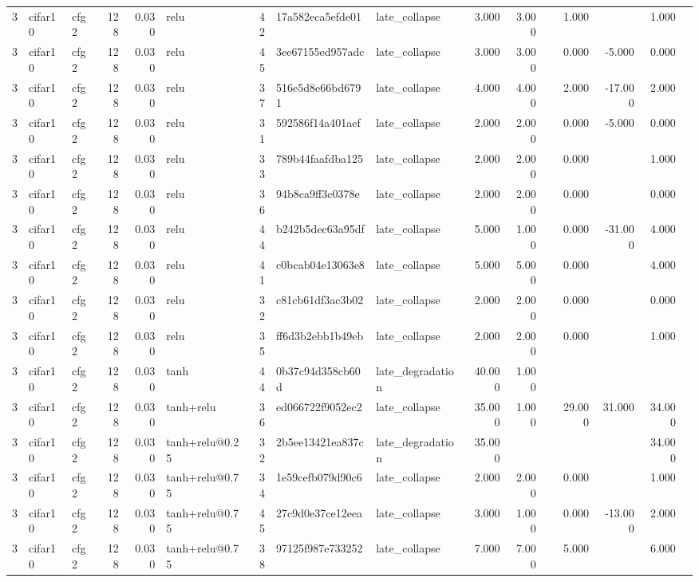 \begin{table}[htbp]
{\begin{tabular}{@{}rllrrlrllrrrrrrr@{}}
3 & cifar10 & cfg2 & 128 & 0.030 & relu & 42 & 17a582eca5efde01 & late\_collapse & 3.000 & 3.000 &  & 1.000 &  & 1.000 &  \\
3 & cifar10 & cfg2 & 128 & 0.030 & relu & 45 & 3ee67155ed957adc & late\_collapse & 3.000 & 3.000 &  & 0.000 & -5.000 & 0.000 &  \\
3 & cifar10 & cfg2 & 128 & 0.030 & relu & 37 & 516e5d8e66bd6791 & late\_collapse & 4.000 & 4.000 &  & 2.000 & -17.000 & 2.000 &  \\
3 & cifar10 & cfg2 & 128 & 0.030 & relu & 31 & 592586f14a401aef & late\_collapse & 2.000 & 2.000 &  & 0.000 & -5.000 & 0.000 &  \\
3 & cifar10 & cfg2 & 128 & 0.030 & relu & 33 & 789b44faafdba125 & late\_collapse & 2.000 & 2.000 &  & 0.000 &  & 1.000 &  \\
3 & cifar10 & cfg2 & 128 & 0.030 & relu & 36 & 94b8ca9ff3c0378e & late\_collapse & 2.000 & 2.000 &  & 0.000 &  & 0.000 &  \\
3 & cifar10 & cfg2 & 128 & 0.030 & relu & 44 & b242b5dec63a95df & late\_collapse & 5.000 & 1.000 &  & 0.000 & -31.000 & 4.000 &  \\
3 & cifar10 & cfg2 & 128 & 0.030 & relu & 41 & c0bcab04e13063e8 & late\_collapse & 5.000 & 5.000 &  & 0.000 &  & 4.000 &  \\
3 & cifar10 & cfg2 & 128 & 0.030 & relu & 32 & c81cb61df3ac3b02 & late\_collapse & 2.000 & 2.000 &  & 0.000 &  & 0.000 &  \\
3 & cifar10 & cfg2 & 128 & 0.030 & relu & 35 & ff6d3b2ebb1b49eb & late\_collapse & 2.000 & 2.000 &  & 0.000 &  & 1.000 &  \\
3 & cifar10 & cfg2 & 128 & 0.030 & tanh & 44 & 0b37c94d358cb60d & late\_degradation & 40.000 & 1.000 &  &  &  &  &  \\
3 & cifar10 & cfg2 & 128 & 0.030 & tanh+relu & 36 & ed066722f9052ec2 & late\_collapse & 35.000 & 1.000 &  & 29.000 & 31.000 & 34.000 &  \\
3 & cifar10 & cfg2 & 128 & 0.030 & tanh+relu@0.25 & 32 & 2b5ee13421ea837c & late\_degradation & 35.000 &  &  &  &  & 34.000 &  \\
3 & cifar10 & cfg2 & 128 & 0.030 & tanh+relu@0.75 & 34 & 1e59cefb079d90c6 & late\_collapse & 2.000 & 2.000 &  & 0.000 &  & 1.000 &  \\
3 & cifar10 & cfg2 & 128 & 0.030 & tanh+relu@0.75 & 45 & 27c9d0e37ce12eea & late\_collapse & 3.000 & 1.000 &  & 0.000 & -13.000 & 2.000 &  \\
3 & cifar10 & cfg2 & 128 & 0.030 & tanh+relu@0.75 & 38 & 97125f987e733252 & late\_collapse & 7.000 & 7.000 &  & 5.000 &  & 6.000 &  \\

\end{tabular}}
\end{table}
